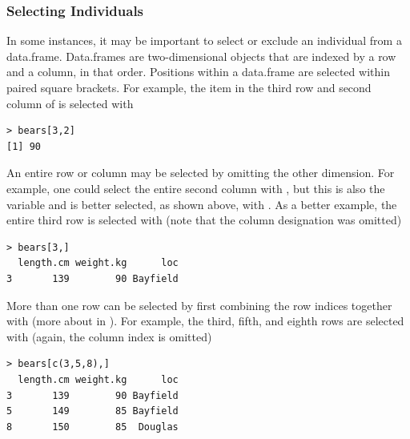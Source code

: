 \documentclass[10pt,openany]{book}\usepackage[]{graphicx}\usepackage[]{color}
\makeatletter
\newenvironment{kframe}{%
 \def\at@end@of@kframe{}%
 \ifinner\ifhmode%
  \def\at@end@of@kframe{\end{minipage}}%
  \begin{minipage}{\columnwidth}%
 \fi\fi%
 \def\FrameCommand##1{\hskip\@totalleftmargin \hskip-\fboxsep
 \colorbox{shadecolor}{##1}\hskip-\fboxsep
     \hskip-\linewidth \hskip-\@totalleftmargin \hskip\columnwidth}%
 \MakeFramed {\advance\hsize-\width
   \@totalleftmargin\z@ \linewidth\hsize
   \@setminipage}}%
 {\par\unskip\endMakeFramed%
 \at@end@of@kframe}
\newenvironment{knitrout}{}{} %
\makeatother
\begin{document}

\subsubsection{Selecting Individuals}  \label{sect:RSelectIndivs}
\vspace{-12pt}

In some instances, it may be important to select or exclude an individual from a data.frame.  Data.frames are two-dimensional objects that are indexed by a row and a column, in that order.  Positions within a data.frame are selected within paired square brackets.  For example, the item in the third row and second column of  is selected with
\begin{knitrout}
\color{fgcolor}\begin{kframe}
\begin{verbatim}
> bears[3,2]
[1] 90
\end{verbatim}
\end{kframe}
\end{knitrout}


An entire row or column may be selected by omitting the other dimension.  For example, one could select the entire second column with , but this is also the  variable and is better selected, as shown above, with .  As a better example, the entire third row is selected with (note that the column designation was omitted)
\begin{knitrout}
\color{fgcolor}\begin{kframe}
\begin{verbatim}
> bears[3,]
  length.cm weight.kg      loc
3       139        90 Bayfield
\end{verbatim}
\end{kframe}
\end{knitrout}

More than one row can be selected by first combining the row indices together with  (more about  in ).  For example, the third, fifth, and eighth rows are selected with (again, the column index is omitted)
\begin{knitrout}
\color{fgcolor}\begin{kframe}
\begin{verbatim}
> bears[c(3,5,8),]
  length.cm weight.kg      loc
3       139        90 Bayfield
5       149        85 Bayfield
8       150        85  Douglas
\end{verbatim}
\end{kframe}
\end{knitrout}
\end{document}
